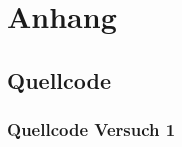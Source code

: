 \documentclass[TGAI_Laborbericht.tex]{subfiles}
\begin{document}
\chapter*{Anhang}
\label{chap:APPENDIX}
\addtocounter{chapter}{1}
\setcounter{section}{0}

\section{Quellcode}
\label{chap:APPENDIX_SOURCECODE}

\subsection{Quellcode Versuch 1}
\label{chap:APPENDIX_SOURCECODE_V1}

\end{document}
